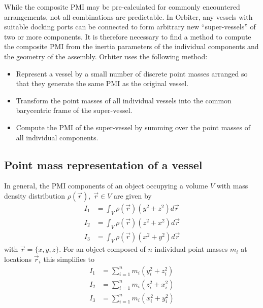 \documentclass[a4paper]{article}
\begin{document}
While the composite PMI may be pre-calculated for commonly encountered arrangements, not all combinations are predictable. In Orbiter, any vessels with suitable docking ports can be connected to form arbitrary new ``super-vessels'' of two or more components. It is therefore necessary to find a method to compute the composite PMI from the inertia parameters of the individual components and the geometry of the assembly.
Orbiter uses the following method:
\begin{itemize}
\item Represent a vessel by a small number of discrete point masses arranged so that they generate the same PMI as the original vessel.
\item Transform the point masses of all individual vessels into the common barycentric frame of the super-vessel.
\item Compute the PMI of the super-vessel by summing over the point masses of all individual components.
\end{itemize}

\subsection{Point mass representation of a vessel}
In general, the PMI components of an object occupying a volume $V$ with mass density distribution $\rho(\vec{r}),\; \vec{r}\in V$ are given by
\begin{equation}
\begin{split}
  I_1 &= \int_V \rho(\vec{r}) (y^2 + z^2) d\vec{r} \\
  I_2 &= \int_V \rho(\vec{r}) (z^2 + x^2) d\vec{r} \\
  I_3 &= \int_V \rho(\vec{r}) (x^2 + y^2) d\vec{r}
\end{split}
\end{equation}
with $\vec{r} = \lbrace x,y,z \rbrace$.
For an object composed of $n$ individual point masses $m_i$ at locations $\vec{r}_i$ this simplifies to
\begin{equation}
\begin{split}
  I_1 &= \sum_{i=1}^n m_i (y_i^2 + z_i^2) \\
  I_2 &= \sum_{i=1}^n m_i (z_i^2 + x_i^2) \\
  I_3 &= \sum_{i=1}^n m_i (x_i^2 + y_i^2)
\end{split}
\end{equation}
\end{document}

